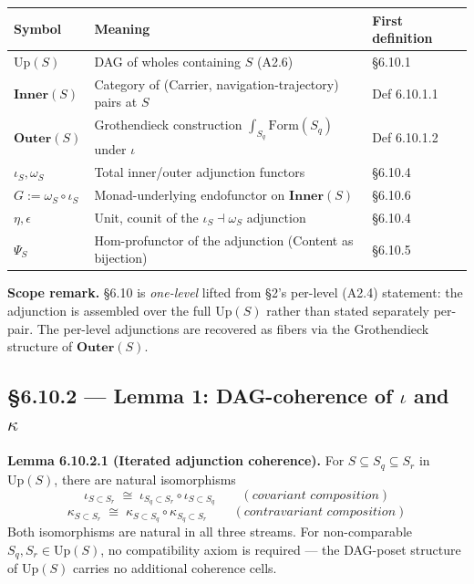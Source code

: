 \documentclass[11pt, openany]{book}
\begin{document}
\begingroup\setlength{\tabcolsep}{3pt}\renewcommand{\arraystretch}{1.15}\footnotesize
\begin{center}
\begin{tabular}{p{1.08in} p{2.65in} p{0.60in}}
\toprule
Symbol & Meaning & First definition \\
\midrule
$\mathrm{Up}(S)$ & DAG of wholes containing $S$ (A2.6) & §6.10.1 \\
$\mathbf{Inner}(S)$ & Category of (Carrier, navigation-trajectory) pairs at $S$ & Def 6.10.1.1 \\
$\mathbf{Outer}(S)$ & Grothendieck construction $\int_{S_q} \mathrm{Form}(S_q)$ under $\iota$ & Def 6.10.1.2 \\
$\iota_S, \omega_S$ & Total inner/\allowbreak outer adjunction functors & §6.10.4 \\
$G := \omega_S \circ \iota_S$ & Monad-underlying endofunctor on $\mathbf{Inner}(S)$ & §6.10.6 \\
$\eta, \epsilon$ & Unit, counit of the $\iota_S \dashv \omega_S$ adjunction & §6.10.4 \\
$\Psi_S$ & Hom-profunctor of the adjunction (Content as bijection) & §6.10.5 \\
\bottomrule
\end{tabular}
\end{center}
\endgroup
\textbf{Scope remark.} §6.10 is \textit{one-level} lifted from §2's per-level (A2.4) statement: the adjunction is assembled over the full $\mathrm{Up}(S)$ rather than stated separately per-pair. The per-level adjunctions are recovered as fibers via the Grothendieck structure of $\mathbf{Outer}(S)$.

\subsection{§6.10.2 --- Lemma 1: DAG-coherence of $\iota$ and $\kappa$}

\textbf{Lemma 6.10.2.1 (Iterated adjunction coherence).} For $S \subseteq S_q \subseteq S_r$ in $\mathrm{Up}(S)$, there are natural isomorphisms
\[
\iota_{S \subset S_r} \;\cong\; \iota_{S_q \subset S_r} \circ \iota_{S \subset S_q} \qquad (\textit{covariant composition})
\]
\[
\kappa_{S \subset S_r} \;\cong\; \kappa_{S \subset S_q} \circ \kappa_{S_q \subset S_r} \qquad (\textit{contravariant composition})
\]
Both isomorphisms are natural in all three streams. For non-comparable $S_q, S_r \in \mathrm{Up}(S)$, no compatibility axiom is required --- the DAG-poset structure of $\mathrm{Up}(S)$ carries no additional coherence cells.
\end{document}
